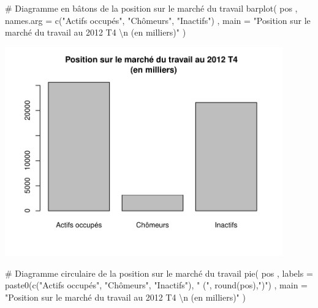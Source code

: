 \documentclass[12pt,twosided, notitlepage]{book}
\newenvironment{Shaded}{}{}
\newcommand{\CharTok}[1]{\textcolor[rgb]{0.00,0.50,0.50}{#1}}
\newcommand{\CommentTok}[1]{\textcolor[rgb]{0.00,0.50,0.00}{#1}}
\newcommand{\DataTypeTok}[1]{#1}
\newcommand{\KeywordTok}[1]{\textcolor[rgb]{0.00,0.00,1.00}{#1}}
\newcommand{\NormalTok}[1]{#1}
\newcommand{\StringTok}[1]{\textcolor[rgb]{0.00,0.50,0.50}{#1}}
\renewenvironment{Shaded}{\begin{snugshade}}{\end{snugshade}}
\begin{document}
\begin{itemize}
\begin{Shaded}
\begin{Highlighting}[]
\CommentTok{# Diagramme en bâtons de la position sur le marché du travail}
\KeywordTok{barplot}\NormalTok{(}
\NormalTok{  pos}
\NormalTok{  , }\DataTypeTok{names.arg =} \KeywordTok{c}\NormalTok{(}\StringTok{"Actifs occupés"}\NormalTok{, }\StringTok{"Chômeurs"}\NormalTok{, }\StringTok{"Inactifs"}\NormalTok{)}
\NormalTok{  , }\DataTypeTok{main =} \StringTok{"Position sur le marché du travail au 2012 T4 }\CharTok{\textbackslash{}n}\StringTok{ (en milliers)"}
\NormalTok{)}
\end{Highlighting}
\end{Shaded}

  \begin{center}\includegraphics[width=12cm]{livret_files/figure-latex/unnamed-chunk-443-1} \end{center}

\begin{Shaded}
\begin{Highlighting}[]

\CommentTok{# Diagramme circulaire de la position sur le marché du travail}
\KeywordTok{pie}\NormalTok{(}
\NormalTok{  pos}
\NormalTok{  , }\DataTypeTok{labels =} \KeywordTok{paste0}\NormalTok{(}\KeywordTok{c}\NormalTok{(}\StringTok{"Actifs occupés"}\NormalTok{, }\StringTok{"Chômeurs"}\NormalTok{, }\StringTok{"Inactifs"}\NormalTok{), }\StringTok{" ("}\NormalTok{, }\KeywordTok{round}\NormalTok{(pos),}\StringTok{")"}\NormalTok{)}
\NormalTok{  , }\DataTypeTok{main =} \StringTok{"Position sur le marché du travail au 2012 T4 }\CharTok{\textbackslash{}n}\StringTok{ (en milliers)"}
\NormalTok{)}
\end{Highlighting}
\end{Shaded}


\end{itemize}
\end{document}
